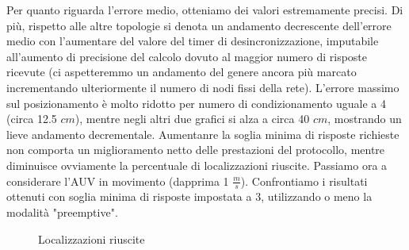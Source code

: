 \documentclass[Lau,binding=0.6cm]{sapthesis}
\begin{document}
Per quanto riguarda l'errore medio, otteniamo dei valori estremamente precisi. Di più, rispetto alle altre topologie si denota un andamento decrescente dell'errore medio con l'aumentare del valore del timer di desincronizzazione, imputabile all'aumento di precisione del calcolo dovuto al maggior numero di risposte ricevute (ci aspetteremmo un andamento del genere ancora più marcato incrementando ulteriormente il numero di nodi fissi della rete).
L'errore massimo sul posizionamento è molto ridotto per numero di condizionamento uguale a 4 (circa 12.5 $cm$), mentre negli altri due grafici si alza a circa 40 $cm$, mostrando un lieve andamento decrementale.
Aumentanre la soglia minima di risposte richieste non comporta un miglioramento netto delle prestazioni del protocollo, mentre diminuisce ovviamente la percentuale di localizzazioni riuscite.
Passiamo ora a considerare l'AUV in movimento (dapprima 1 $\frac{m}{s}$).
Confrontiamo i risultati ottenuti con soglia minima di risposte impostata a 3, utilizzando o meno la modalità "preemptive".
\begin{figure}[H]
    \centering
    \hfill
    \caption{Localizzazioni riuscite}
\end{figure}
\end{document}
